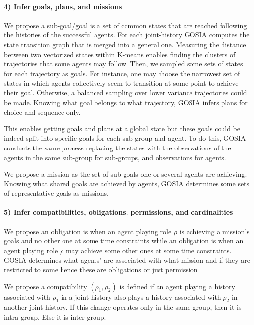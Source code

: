 \documentclass[doubleblind]{ecai}
\begin{document}
\paragraph{4) Infer goals, plans, and missions}

We propose a sub-goal/goal is a set of common states that are reached following the histories of the successful agents.
For each joint-history GOSIA computes the state transition graph that is merged into a general one. Measuring the distance between two vectorized states within K-means enables finding the clusters of trajectories that some agents may follow. Then, we sampled some sets of states for each trajectory as goals. For instance, one may choose the narrowest set of states in which agents collectively seem to transition at some point to achieve their goal. Otherwise, a balanced sampling over lower variance trajectories could be made. Knowing what goal belongs to what trajectory, GOSIA infers plans for choice and sequence only.

This enables getting goals and plans at a global state but these goals could be indeed split into specific goals for each sub-group and agent. To do this, GOSIA conducts the same process replacing the states with the observations of the agents in the same sub-group for sub-groups, and observations for agents.

We propose a mission as the set of sub-goals one or several agents are achieving.
Knowing what shared goals are achieved by agents, GOSIA determines some sets of representative goals as missions.

\paragraph{5) Infer compatibilities, obligations, permissions, and cardinalities}

We propose an obligation is when an agent playing role $\rho$ is achieving a mission's goals and no other one at some time constraints while an obligation is when an agent playing role $\rho$ may achieve some other ones at some time constraints.
GOSIA determines what agents' are associated with what mission and if they are restricted to some hence these are obligations or just permission

We propose a compatibility $(\rho_1,\rho_2)$ is defined if an agent playing a history associated with $\rho_1$ in a joint-history also plays a history associated with $\rho_2$ in another joint-history. If this change operates only in the same group, then it is intra-group. Else it is inter-group.
\end{document}
